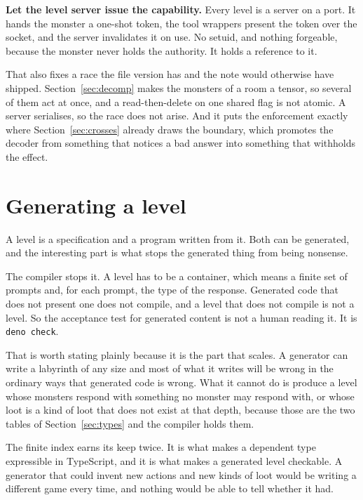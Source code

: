 \documentclass[11pt,a4paper]{article}
\begin{document}
\begin{sectionbox}
\textbf{Let the level server issue the capability.} Every level is a server on a port. It hands the
monster a one-shot token, the tool wrappers present the token over the socket, and the server
invalidates it on use. No setuid, and nothing forgeable, because the monster never holds the
authority. It holds a reference to it.
\end{sectionbox}

That also fixes a race the file version has and the note would otherwise have shipped.
Section~\ref{sec:decomp} makes the monsters of a room a tensor, so several of them act at once, and
a read-then-delete on one shared flag is not atomic. A server serialises, so the race does not
arise. And it puts the enforcement exactly where Section~\ref{sec:crosses} already draws the
boundary, which promotes the decoder from something that notices a bad answer into something that
withholds the effect.

\section{Generating a level}
\label{sec:gen}

A level is a specification and a program written from it. Both can be generated, and the
interesting part is what stops the generated thing from being nonsense.

The compiler stops it. A level has to be a container, which means a finite set of prompts and,
for each prompt, the type of the response. Generated code that does not present one
does not compile, and a level that does not compile is not a level. So the acceptance test for
generated content is not a human reading it. It is \texttt{deno check}.

That is worth stating plainly because it is the part that scales. A generator can write a
labyrinth of any size and most of what it writes will be wrong in the ordinary ways that
generated code is wrong. What it cannot do is produce a level whose monsters respond with
something no monster may respond with, or whose loot is a kind of loot that does not exist at that
depth, because those are the two tables of Section~\ref{sec:types} and the compiler holds them.

\begin{sectionbox}
The finite index earns its keep twice. It is what makes a dependent type expressible in
TypeScript, and it is what makes a generated level checkable. A generator that could invent new
actions and new kinds of loot would be writing a different game every time, and nothing would be
able to tell whether it had.
\end{sectionbox}
\end{document}
